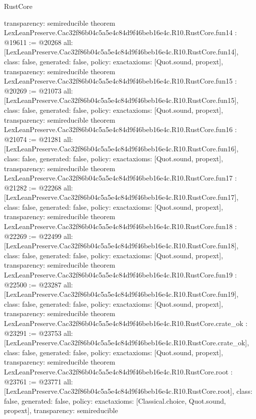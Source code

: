 \begin{lexlean}{RustCore}
\begin{coremodule}
{  transparency: semireducible
}
theorem LexLeanPreserve.Cac32f86b04c5a5e4c84d9f46beb16e4c.R10.RustCore.fun14 : @19611 := @20268 {
  all: [LexLeanPreserve.Cac32f86b04c5a5e4c84d9f46beb16e4c.R10.RustCore.fun14],
  class: false,
  generated: false,
  policy: exact{axioms: [Quot.sound, propext]},
  transparency: semireducible
}
theorem LexLeanPreserve.Cac32f86b04c5a5e4c84d9f46beb16e4c.R10.RustCore.fun15 : @20269 := @21073 {
  all: [LexLeanPreserve.Cac32f86b04c5a5e4c84d9f46beb16e4c.R10.RustCore.fun15],
  class: false,
  generated: false,
  policy: exact{axioms: [Quot.sound, propext]},
  transparency: semireducible
}
theorem LexLeanPreserve.Cac32f86b04c5a5e4c84d9f46beb16e4c.R10.RustCore.fun16 : @21074 := @21281 {
  all: [LexLeanPreserve.Cac32f86b04c5a5e4c84d9f46beb16e4c.R10.RustCore.fun16],
  class: false,
  generated: false,
  policy: exact{axioms: [Quot.sound, propext]},
  transparency: semireducible
}
theorem LexLeanPreserve.Cac32f86b04c5a5e4c84d9f46beb16e4c.R10.RustCore.fun17 : @21282 := @22268 {
  all: [LexLeanPreserve.Cac32f86b04c5a5e4c84d9f46beb16e4c.R10.RustCore.fun17],
  class: false,
  generated: false,
  policy: exact{axioms: [Quot.sound, propext]},
  transparency: semireducible
}
theorem LexLeanPreserve.Cac32f86b04c5a5e4c84d9f46beb16e4c.R10.RustCore.fun18 : @22269 := @22499 {
  all: [LexLeanPreserve.Cac32f86b04c5a5e4c84d9f46beb16e4c.R10.RustCore.fun18],
  class: false,
  generated: false,
  policy: exact{axioms: [Quot.sound, propext]},
  transparency: semireducible
}
theorem LexLeanPreserve.Cac32f86b04c5a5e4c84d9f46beb16e4c.R10.RustCore.fun19 : @22500 := @23287 {
  all: [LexLeanPreserve.Cac32f86b04c5a5e4c84d9f46beb16e4c.R10.RustCore.fun19],
  class: false,
  generated: false,
  policy: exact{axioms: [Quot.sound, propext]},
  transparency: semireducible
}
theorem LexLeanPreserve.Cac32f86b04c5a5e4c84d9f46beb16e4c.R10.RustCore.crate_ok : @23291 := @23753 {
  all: [LexLeanPreserve.Cac32f86b04c5a5e4c84d9f46beb16e4c.R10.RustCore.crate_ok],
  class: false,
  generated: false,
  policy: exact{axioms: [Quot.sound, propext]},
  transparency: semireducible
}
theorem LexLeanPreserve.Cac32f86b04c5a5e4c84d9f46beb16e4c.R10.RustCore.root : @23761 := @23771 {
  all: [LexLeanPreserve.Cac32f86b04c5a5e4c84d9f46beb16e4c.R10.RustCore.root],
  class: false,
  generated: false,
  policy: exact{axioms: [Classical.choice, Quot.sound, propext]},
  transparency: semireducible
}


\end{coremodule}
\end{lexlean}

